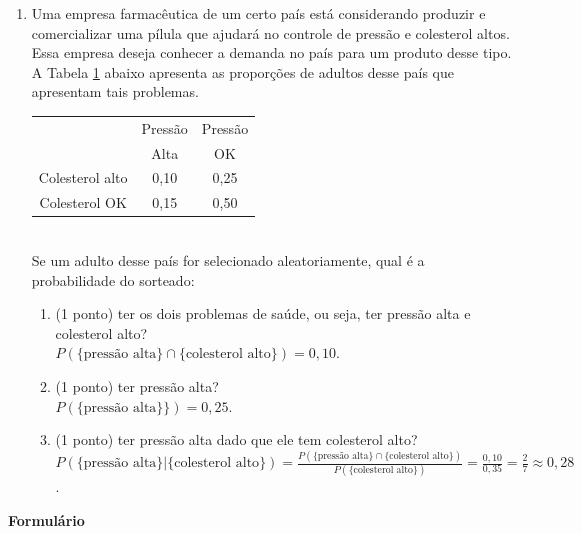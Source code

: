 \documentclass{article}
\begin{document}
\begin{enumerate}
\item Uma empresa farmacêutica de um certo país está considerando produzir e comercializar uma pílula que ajudará no controle de pressão e colesterol altos. 
Essa empresa deseja conhecer a demanda no país para um produto desse tipo. 
A Tabela \ref{t:pressao_colesterol} abaixo apresenta as proporções de adultos desse país que apresentam tais problemas.
\begin{table}[htp]
\centering
\label{t:pressao_colesterol}
\begin{tabular}{c|cc}
\hline
  & Pressão & Pressão  \\
 & Alta & OK \\
\hline
Colesterol alto & 0,10 & 0,25 \\
Colesterol OK   & 0,15 & 0,50 \\
\hline
\end{tabular}
\end{table}\\
Se um adulto desse país for selecionado aleatoriamente, qual é a probabilidade do sorteado:
\begin{enumerate}
	\item (1 ponto) ter os dois problemas de saúde, ou seja, ter pressão alta e colesterol alto?\\
	{\color{blue}
	$P(\{\text{pressão alta}\} \cap \{\text{colesterol alto}\}) = 0,10$.
	}
	
	\item (1 ponto) ter pressão alta?\\
	{\color{blue}
	$P(\{\text{pressão alta}\} \}) = 0,25$.	
	}
	
	\item (1 ponto) ter pressão alta dado que ele tem colesterol alto?\\
	{\color{blue}
	$P(\{\text{pressão alta}\} | \{\text{colesterol alto}\}) = \frac{ P(\{\text{pressão alta}\} \cap \{\text{colesterol alto}\}) }{P( \{\text{colesterol alto}\} )} = \frac{0,10}{0,35} = \frac{2}{7} \approx 0,28$.	
	}
	
\end{enumerate}

\end{enumerate}



\vspace{2cm}

\begin{center}
	\Large{\textbf{Formulário}}
\end{center}
\end{document}

